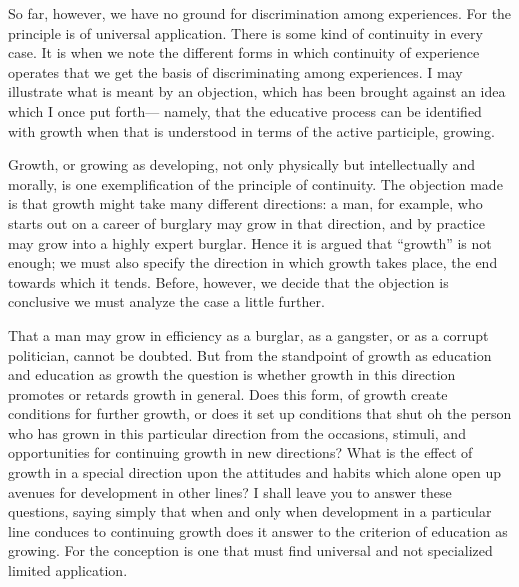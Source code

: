 So far, however, we have no ground for discrimination among experiences. For the 
principle is of universal application. There is some kind of continuity in every case. It is 
when we note the different forms in which continuity of experience operates that we get 
the basis of discriminating among experiences. I may illustrate what is meant by an 
objection, which has been brought against an idea which I once put forth— namely, that 
the educative process can be identified with growth when that is understood in terms of 
the active participle, growing. 

Growth, or growing as developing, not only physically but intellectually and morally, 
is one exemplification of the principle of continuity. The objection made is that growth 
might take many different directions: a man, for example, who starts out on a career of 
burglary may grow in that direction, and by practice may grow into a highly expert 
burglar. Hence it is argued that \enquote{growth} is not enough; we must also specify the 
direction in which growth takes place, the end towards which it tends. Before, however, 
we decide that the objection is conclusive we must analyze the case a little further. 

That a man may grow in efficiency as a burglar, as a gangster, or as a corrupt 
politician, cannot be doubted. But from the standpoint of growth as education and 
education as growth the question is whether growth in this direction promotes or retards 
growth in general. Does this form, of growth create conditions for further growth, or does 
it set up conditions that shut oh the person who has grown in this particular direction 
from the occasions, stimuli, and opportunities for continuing growth in new directions? 
What is the effect of growth in a special direction upon the attitudes and habits which 
alone open up avenues for development in other lines? I shall leave you to answer these 
questions, saying simply that when and only when development in a particular line 
conduces to continuing growth does it answer to the criterion of education as growing. 
For the conception is one that must find universal and not specialized limited application. 

